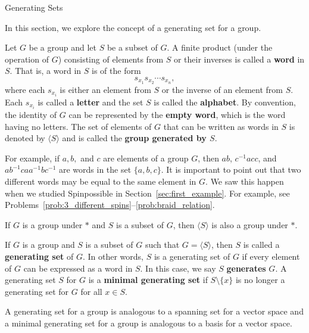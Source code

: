 
\begin{section}{Generating Sets}


In this section, we explore the concept of a generating set for a group.

\begin{definition}
Let $G$ be a group and let $S$ be a subset of $G$. A finite product (under the operation of $G$) consisting of elements from $S$ or their inverses is called a \textbf{word} in $S$. That is, a word in $S$ is of the form
\[
s_{x_1}s_{x_2}\cdots s_{x_n},
\]
where each $s_{x_i}$ is either an element from $S$ or the inverse of an element from $S$. Each $s_{x_i}$ is called a \textbf{letter} and the set $S$ is called the \textbf{alphabet}. By convention, the identity of $G$ can be represented by the \textbf{empty word}, which is the word having no letters. The set of elements of $G$ that can be written as words in $S$ is denoted by $\langle S\rangle$ and is called the \textbf{group generated by $S$}.
\end{definition}

For example, if $a, b,$ and $c$ are elements of a group $G$, then $ab$, $c^{-1}acc$, and $ab^{-1}caa^{-1}bc^{-1}$ are words in the set $\{a,b,c\}$.  It is important to point out that two different words may be equal to the same element in $G$. We saw this happen when we studied Spinpossible in Section~\ref{sec:first_example}. For example, see Problems~\ref{prob:3_different_spins}--\ref{prob:braid_relation}.

\begin{theorem}\label{thm:subgroup_generated_by_S}
If $G$ is a group under $*$ and $S$ is a subset of $G$, then $\langle S\rangle$ is also a group under $*$.
\end{theorem}

\begin{definition}
If $G$ is a group and $S$ is a subset of $G$ such that $G=\langle S\rangle$, then $S$ is called a \textbf{generating set} of $G$. In other words, $S$ is a generating set of $G$ if every element of $G$ can be expressed as a word in $S$.  In this case, we say $S$ \textbf{generates} $G$.  A generating set $S$ for $G$ is a \textbf{minimal generating set} if $S\setminus\{x\}$ is no longer a generating set for $G$ for all $x\in S$.
\end{definition}

A generating set for a group is analogous to a spanning set for a vector space and a minimal generating set for a group is analogous to a basis for a vector space.  


\end{section}
